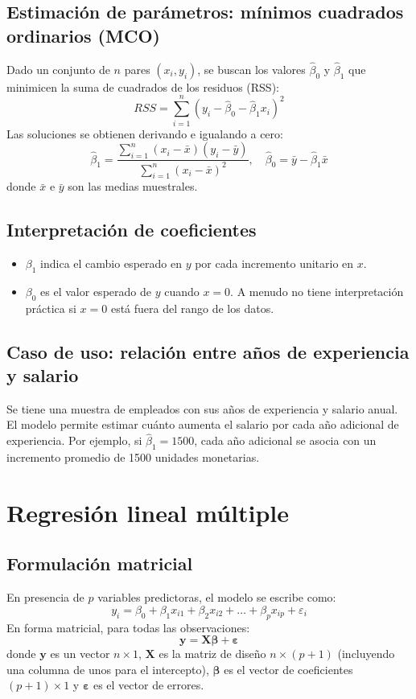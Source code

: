 \documentclass[12pt,a4paper,openany,oneside]{book}
\begin{document}
\subsection{Estimación de parámetros: mínimos cuadrados ordinarios (MCO)}
Dado un conjunto de \(n\) pares \((x_i, y_i)\), se buscan los valores \(\hat{\beta}_0\) y \(\hat{\beta}_1\) que minimicen la suma de cuadrados de los residuos (RSS):
\[
RSS = \sum_{i=1}^n (y_i - \hat{\beta}_0 - \hat{\beta}_1 x_i)^2
\]
Las soluciones se obtienen derivando e igualando a cero:
\[
\hat{\beta}_1 = \frac{\sum_{i=1}^n (x_i - \bar{x})(y_i - \bar{y})}{\sum_{i=1}^n (x_i - \bar{x})^2}, \quad
\hat{\beta}_0 = \bar{y} - \hat{\beta}_1 \bar{x}
\]
donde \(\bar{x}\) e \(\bar{y}\) son las medias muestrales.

\subsection{Interpretación de coeficientes}
\begin{itemize}
    \item \(\beta_1\) indica el cambio esperado en \(y\) por cada incremento unitario en \(x\).
    \item \(\beta_0\) es el valor esperado de \(y\) cuando \(x=0\). A menudo no tiene interpretación práctica si \(x=0\) está fuera del rango de los datos.
\end{itemize}

\subsection{Caso de uso: relación entre años de experiencia y salario}
Se tiene una muestra de empleados con sus años de experiencia y salario anual. El modelo permite estimar cuánto aumenta el salario por cada año adicional de experiencia. Por ejemplo, si \(\hat{\beta}_1 = 1500\), cada año adicional se asocia con un incremento promedio de 1500 unidades monetarias.

\section{Regresión lineal múltiple}

\subsection{Formulación matricial}
En presencia de \(p\) variables predictoras, el modelo se escribe como:
\[
y_i = \beta_0 + \beta_1 x_{i1} + \beta_2 x_{i2} + \dots + \beta_p x_{ip} + \varepsilon_i
\]
En forma matricial, para todas las observaciones:
\[
\mathbf{y} = \mathbf{X}\boldsymbol{\beta} + \boldsymbol{\varepsilon}
\]
donde \(\mathbf{y}\) es un vector \(n \times 1\), \(\mathbf{X}\) es la matriz de diseño \(n \times (p+1)\) (incluyendo una columna de unos para el intercepto), \(\boldsymbol{\beta}\) es el vector de coeficientes \((p+1) \times 1\) y \(\boldsymbol{\varepsilon}\) es el vector de errores.
\end{document}
